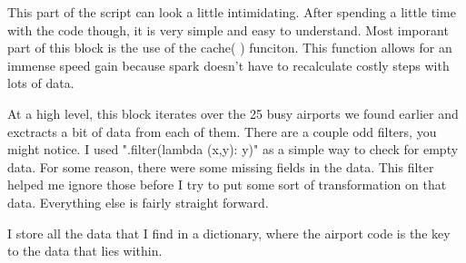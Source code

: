 \documentclass[11pt]{article}
\begin{document}
This part of the script can look a little intimidating. After spending a
little time with the code though, it is very simple and easy to
understand. Most imporant part of this block is the use of the cache( )
funciton. This function allows for an immense speed gain because spark
doesn't have to recalculate costly steps with lots of data.

At a high level, this block iterates over the 25 busy airports we found
earlier and exctracts a bit of data from each of them. There are a
couple odd filters, you might notice. I used ".filter(lambda (x,y): y)"
as a simple way to check for empty data. For some reason, there were
some missing fields in the data. This filter helped me ignore those
before I try to put some sort of transformation on that data. Everything
else is fairly straight forward.

I store all the data that I find in a dictionary, where the airport code
is the key to the data that lies within.
\end{document}
